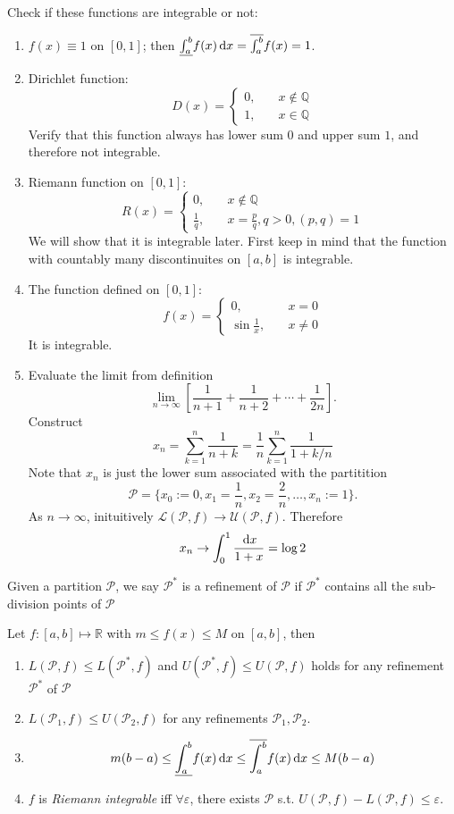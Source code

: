 \begin{example}
Check if these functions are integrable or not:
\begin{enumerate}
\item
$f(x)\equiv 1$ on $[0,1]$; then $\underline{\int_{a}^{b}}f(x)\,\mathrm{d} x=\overline{\int_{a}^{b}}f(x)=1$.
\item
Dirichlet function:
\[
D(x)=\left\{
\begin{aligned}
0,&\quad x\notin\mathbb{Q}\\
1,&\quad x\in\mathbb{Q}
\end{aligned}
\right.
\]
Verify that this function always has lower sum $0$ and upper sum $1$, and therefore not integrable.
\item
Riemann function on $[0,1]$:
\[
R(x)=\left\{
\begin{aligned}
0,&\quad x\notin\mathbb{Q}\\
\frac{1}{q},&\quad x=\frac{p}{q}, q>0, (p,q)=1
\end{aligned}
\right.
\]
We will show that it is integrable later. First keep in mind that the function with countably many discontinuites on $[a,b]$ is integrable.
\item
The function defined on $[0,1]$:
\[
f(x)=\left\{
\begin{aligned}
0,&\quad x=0\\
\sin\frac{1}{x},&\quad x\ne0
\end{aligned}
\right.
\]
It is integrable.
\item
Evaluate the limit from definition
\[
\lim_{n\to\infty}\left[\frac{1}{n+1}+\frac{1}{n+2}+\cdots+\frac{1}{2n}\right].
\]
Construct
\[
x_n=\sum_{k=1}^n\frac{1}{n+k}=\frac{1}{n}\sum_{k=1}^n\frac{1}{1+k/n}
\]
Note that $x_n$ is just the lower sum associated with the partitition
\[
\mathcal{P}=\{x_0:=0,x_1=\frac{1}{n},x_2=\frac{2}{n},\dots,x_n:=1\}.
\]
As $n\to\infty$, inituitively $\mathcal{L}(\mathcal{P},f)\to\mathcal{U}(\mathcal{P},f)$. Therefore
\[
x_n\to\int_0^1\frac{\,\mathrm{d} x}{1+x}=\log2
\]
\end{enumerate}
\end{example}
\begin{definition}[Refinement]
Given a partition $\mathcal{P}$, we say $\mathcal{P}^*$ is a refinement of $\mathcal{P}$ if $\mathcal{P}^*$ contains all the sub-division points of $\mathcal{P}$
\end{definition}
\begin{proposition}
Let $f: [a,b]\mapsto\mathbb{R}$ with $m\le f(x)\le M$ on $[a,b]$, then
\begin{enumerate}
\item
$L(\mathcal{P},f)\le L(\mathcal{P}^*,f)$ and $U(\mathcal{P}^*,f)\le U(\mathcal{P},f)$ holds for any refinement $\mathcal{P}^*$ of $\mathcal{P}$
\item
$L(\mathcal{P}_1,f)\le U(\mathcal{P}_2,f)$ for any refinements $\mathcal{P}_1,\mathcal{P}_2$.
\item
\[
m(b-a)\le \underline{\int_{a}^{b}}f(x)\,\mathrm{d} x\le
\overline{\int_{a}^{b}}f(x)\,\mathrm{d} x\le M(b-a)
\]
\item
$f$ is \emph{Riemann integrable} iff $\forall\varepsilon$, there exists $\mathcal{P}$ s.t. $U(\mathcal{P},f) - L(\mathcal{P},f)\le\varepsilon$.
\end{enumerate}
\end{proposition}
